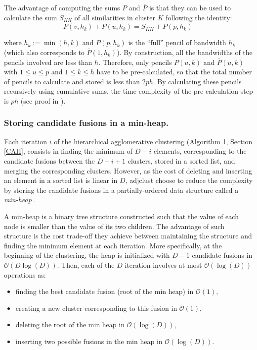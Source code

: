 \documentclass[]{book}
\begin{document}
The advantage of computing the sums \(P\) and \(\bar{P}\) is that they can
be used to calculate the sum \(S_{KK}\) of all similarities in cluster \(K\)
following the identity:
\begin{equation}
P(v, h_k) + \bar{P}(u, h_k) = S_{KK} + P(p, h_k)\,
\label{eq:pencilsums}
\end{equation}

where \(h_k:=\min(h,k)\) and \(P(p, h_k)\) is the ``full'' pencil of bandwidth \(h_k\)
(which also corresponds to \(\bar{P}(1, h_k)\)). By construction, all the
bandwidths of the pencils involved are less than \(h\). Therefore, only
pencils \(P(u,k)\) and \(\bar{P}(u,k)\) with \(1 \leq u \leq p\) and
\(1 \leq k \leq h\) have to be pre-calculated, so that the total number of
pencils to calculate and stored is less than \(2ph\). By calculating these
pencils recursively using cumulative sums, the time complexity of the
pre-calculation step is \(ph\) (see proof in \citep{dehman2015spatial}).

\hypertarget{storing-candidate-fusions-in-a-min-heap.}{%
\subsubsection{Storing candidate fusions in a min-heap.}\label{storing-candidate-fusions-in-a-min-heap.}}

Each iteration \(i\) of the hierarchical agglomerative clustering
(Algorithm 1, Section \ref{CAH}, consists in finding the
minimum of \(D-i\) elements, corresponding to the candidate fusions
between the \(D-i+1\) clusters, stored in a sorted list, and merging the
corresponding clusters. However, as the cost of deleting and inserting
an element in a sorted list is linear in \(D\), adjclust choose to reduce
the complexity by storing the candidate fusions in a partially-ordered
data structure called a \emph{min-heap} \citep{williams1964algorithm}.

A min-heap is a binary tree structure constructed such that the value of
each node is smaller than the value of its two children. The advantage
of such structure is the cost trade-off they achieve between maintaining
the structure and finding the minimum element at each iteration. More
specifically, at the beginning of the clustering, the heap is
initialized with \(D-1\) candidate fusions in \(\mathcal{O}(D \log(D))\).
Then, each of the \(D\) iteration involves at most \(\mathcal{O}(\log(D))\)
operations as:

\begin{itemize}
\item
  finding the best candidate fusion (root of the min heap) in \(\mathcal{O}(1)\),
\item
  creating a new cluster corresponding to this fusion in \(\mathcal{O}(1)\),
\item
  deleting the root of the min heap in \(\mathcal{O}(\log(D))\),
\item
  inserting two possible fusions in the min heap in \(\mathcal{O}(\log(D))\).
\end{itemize}
\end{document}
